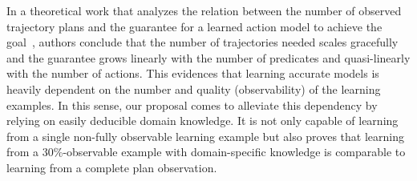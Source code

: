 \documentclass{article}
\begin{document}
In a theoretical work that analyzes the relation between the number of observed trajectory plans and the guarantee for a learned action model to achieve the goal~\cite{SternJ17}, authors conclude that the number of trajectories needed scales gracefully and the guarantee grows linearly with the number of predicates and quasi-linearly with the number of actions. This evidences that learning accurate models is heavily dependent on the number and quality (observability) of the learning examples. In this sense, our proposal comes to alleviate this dependency by relying on easily deducible domain knowledge. It is not only capable of learning from a single non-fully observable learning example but also proves that learning from a 30\%-observable example with domain-specific knowledge is comparable to learning from a complete plan observation.





\end{document}
